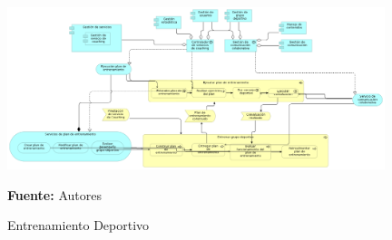 \begin{figure}[!htb]
  \begin{center}
    \includegraphics[width=11cm]{./imagenes/application_usage/entrenamientodeportivo.png}
    \caption{Entrenamiento Deportivo}
    \label{fig:au_entrenamiento_deportivo}
    \textbf{Fuente:}  Autores
  \end{center}
\end{figure}

